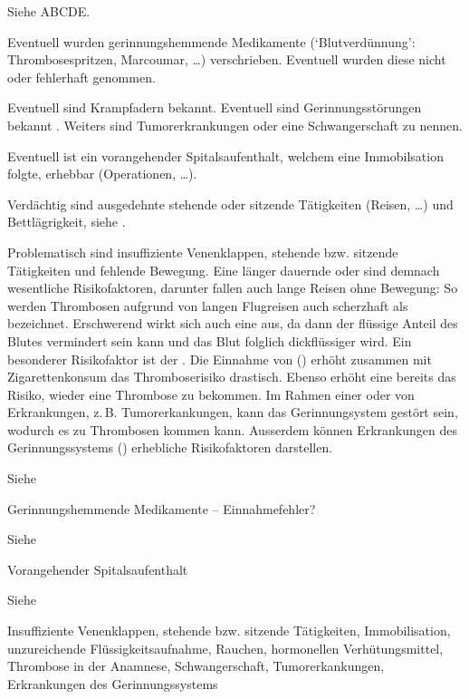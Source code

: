 \TextSlide
{{\TxSAMPLER}}
{
\begin{SAMPLERText}
  \item[\SAMPLER{S}] Siehe ABCDE.
  \item[\SAMPLER{M}] Eventuell wurden gerinnungshemmende
  Medikamente (\enquote*{Blutverdünnung}:
  Thrombosespritzen, Marcoumar{\texttrademark}, \ldots)
  verschrieben. Eventuell wurden diese nicht oder fehlerhaft
  genommen.
  \item[\SAMPLER{P}] Eventuell sind Krampfadern
   bekannt. Eventuell
  sind Gerinnungsstörungen bekannt . Weiters sind
  Tumorerkrankungen oder eine Schwangerschaft zu nennen.
  \item[\SAMPLER{L}] Eventuell ist ein vorangehender
  Spitalsaufenthalt, welchem eine Immobilsation folgte,
  erhebbar (Operationen, \ldots).
  \item[\SAMPLER{E}] Verdächtig sind ausgedehnte stehende
  oder sitzende Tätigkeiten (Reisen, \ldots) und
  Bettlägrigkeit, siehe {}.
  \item[\SAMPLER{R}]
  Problematisch sind insuffiziente Venenklappen, stehende bzw. sitzende
  Tätigkeiten und fehlende Bewegung.
  Eine länger dauernde  oder
   sind demnach wesentliche
  Risikofaktoren,
  darunter fallen auch lange Reisen ohne Bewegung: So werden
  Thrombosen aufgrund von langen Flugreisen auch scherzhaft als  bezeichnet.
  Erschwerend wirkt sich auch eine  aus, da dann der flüssige Anteil des
  Blutes vermindert sein kann und das Blut folglich
  dickflüssiger wird.
  Ein besonderer Risikofaktor ist der
  .
  Die Einnahme von 
  () erhöht zusammen mit
  Zigarettenkonsum das Thromboserisiko drastisch.
  Ebenso erhöht eine bereits  das Risiko, wieder eine Thrombose zu bekommen.
  Im Rahmen einer
   oder von
  Erkrankungen, z.\,B.
  Tumorerkankungen, kann das Gerinnungsystem gestört sein, wodurch es zu Thrombosen
  kommen kann. Ausserdem können Erkrankungen des
  Gerinnungssystems ()  erhebliche
  Risikofaktoren darstellen.
\end{SAMPLERText}
}
{
\begin{SAMPLERSlide}
  \item[\SAMPLER{S}] Siehe {\TxABCDE}
  \item[\SAMPLER{M}] Gerinnungshemmende
  Medikamente -- Einnahmefehler?
  \item[\SAMPLER{P}] Siehe {}
  \item[\SAMPLER{L}] Vorangehender
  Spitalsaufenthalt
  \item[\SAMPLER{E}] Siehe {}
  \item[\SAMPLER{R}] Insuffiziente Venenklappen, stehende bzw. sitzende
  Tätigkeiten, Immobilisation, unzureichende
  Flüssigkeitsaufnahme, Rauchen, hormonellen Verhütungsmittel, 
  Thrombose in der Anamnese, Schwangerschaft, 
  Tumorerkankungen, Erkrankungen des
  Gerinnungssystems 
\end{SAMPLERSlide}
}
